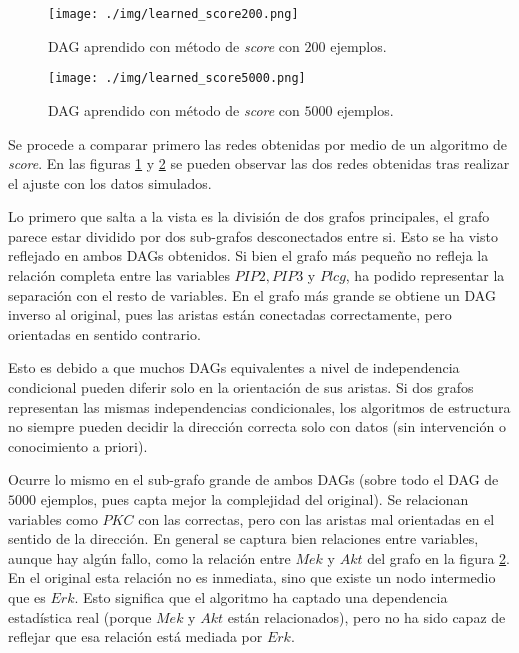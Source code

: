 \documentclass[12pt,letterpaper]{article}
\begin{document}
\begin{figure}[htp]
    \centering
    \texttt{[image: ./img/learned\_score200.png]}
    \caption{DAG aprendido con método de \textit{score} con $200$ ejemplos.}
    \label{fig:learnedscore200}
\end{figure}
\begin{figure}[htp]
    \centering
    \texttt{[image: ./img/learned\_score5000.png]}
    \caption{DAG aprendido con método de \textit{score} con $5000$ ejemplos.}
    \label{fig:learnedscore5000}
\end{figure}

Se procede a comparar primero las redes obtenidas por medio de un algoritmo de \textit{score}. En las figuras \ref{fig:learnedscore200} y \ref{fig:learnedscore5000} se pueden observar las dos redes obtenidas tras realizar el ajuste con los datos simulados.

Lo primero que salta a la vista es la división de dos grafos principales, el grafo parece estar dividido por dos sub-grafos desconectados entre si. Esto se ha visto reflejado en ambos DAGs obtenidos. Si bien el grafo más pequeño no refleja la relación completa entre las variables $PIP2, PIP3$ y $Plcg$, ha podido representar la separación con el resto de variables. En el grafo más grande se obtiene un DAG inverso al original, pues las aristas están conectadas correctamente, pero orientadas en sentido contrario.

Esto es debido a que muchos DAGs equivalentes a nivel de independencia condicional pueden diferir solo en la orientación de sus aristas.
Si dos grafos representan las mismas independencias condicionales, los algoritmos de estructura no siempre pueden decidir la dirección correcta solo con datos (sin intervención o conocimiento a priori).

Ocurre lo mismo en el sub-grafo grande de ambos DAGs (sobre todo el DAG de $5000$ ejemplos, pues capta mejor la complejidad del original). Se relacionan variables como $PKC$ con las correctas, pero con las aristas mal orientadas en el sentido de la dirección. En general se captura bien relaciones entre variables, aunque hay algún fallo, como la relación entre $Mek$ y $Akt$ del grafo en la figura \ref{fig:learnedscore5000}. En el original esta relación no es inmediata, sino que existe un nodo intermedio que es $Erk$. Esto significa que el algoritmo ha captado una dependencia estadística real (porque $Mek$ y $Akt$ están relacionados), pero no ha sido capaz de reflejar que esa relación está mediada por $Erk$.
\end{document}

